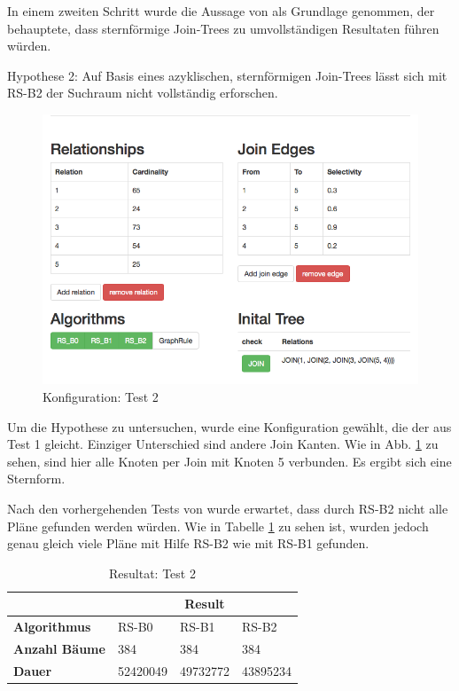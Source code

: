In einem zweiten Schritt wurde die Aussage von \cite{shanbhag2014optimizing} als Grundlage genommen, der behauptete, dass sternförmige Join-Trees zu umvollständigen Resultaten führen würden.

Hypothese 2: Auf Basis eines azyklischen, sternförmigen Join-Trees lässt sich mit RS-B2 der Suchraum nicht vollständig erforschen.

\begin{figure}[ht]
  \centering
  \includegraphics[width=\textwidth]{05_ResultsEvaluation/00_media/Test2.png}
  \caption{Konfiguration: Test 2}
  \label{Konfiguration:Test2}
\end{figure}


Um die Hypothese zu untersuchen, wurde eine Konfiguration gewählt, die der aus Test 1 gleicht. Einziger Unterschied sind andere Join Kanten. Wie in  Abb. \ref{Konfiguration:Test2} zu sehen, sind hier alle Knoten per Join mit Knoten 5 verbunden. Es ergibt sich eine Sternform.

Nach den vorhergehenden Tests von \cite{shanbhag2014optimizing} wurde erwartet, dass durch RS-B2 nicht alle Pläne gefunden werden würden. Wie in Tabelle \ref{Result:Test2} zu sehen ist, wurden jedoch genau gleich viele Pläne mit Hilfe RS-B2 wie mit RS-B1 gefunden. 

\begin{table}[h]
\centering

\begin{tabular}{|l|l|l|l|}
\hline
                         & \multicolumn{3}{c|}{{\bf Result}} \\ \hline
{\bf Algorithmus}        & RS-B0     & RS-B1     & RS-B2     \\ \hline
{\bf Anzahl Bäume}       & 384       & 384       & 384       \\ \hline
{\bf Dauer}              & 52420049  & 49732772  & 43895234  \\ \hline
\end{tabular}

\caption{Resultat: Test 2}
\label{Result:Test2}
\end{table}


